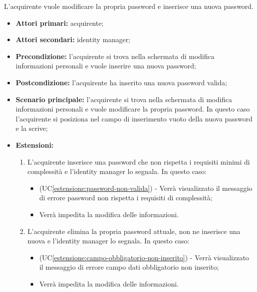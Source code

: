 \label{modifica-informazioni-acquirente.password.nuova-password}

L'acquirente vuole modificare la propria password e inserisce una nuova password.
\begin{itemize}
    \item \textbf{Attori primari:} acquirente;
    \item \textbf{Attori secondari:} identity manager;
    \item \textbf{Precondizione:} l'acquirente si trova nella schermata di modifica informazioni personali e vuole inserire una nuova password;
    \item \textbf{Postcondizione:} l'acquirente ha inserito una nuova password valida;
    \item \textbf{Scenario principale:} l'acquirente si trova nella schermata di modifica informazioni personali e vuole modificare la propria password. In questo caso l'acquirente si posiziona nel campo di inserimento vuoto della nuova password e la scrive;
    \item \textbf{Estensioni:}
    \begin{enumerate}[label=\lett]
        \item L'acquirente inserisce una password che non rispetta i requisiti minimi di complessità e l'identity manager lo segnala. In questo caso:
        \begin{itemize}
            \item (UC\ref{estensione:password-non-valida}) - Verrà visualizzato il messaggio di errore password non rispetta i requisiti di complessità;
            \item Verrà impedita la modifica delle informazioni.
        \end{itemize}
        \item L'acquirente elimina la propria password attuale, non ne inserisce una nuova e l'identity manager lo segnala. In questo caso:
        \begin{itemize}
            \item (UC\ref{estensione:campo-obbligatorio-non-inserito}) - Verrà visualizzato il messaggio di errore campo dati obbligatorio non inserito;
            \item Verrà impedita la modifica delle informazioni.
        \end{itemize}
    \end{enumerate}
\end{itemize}


